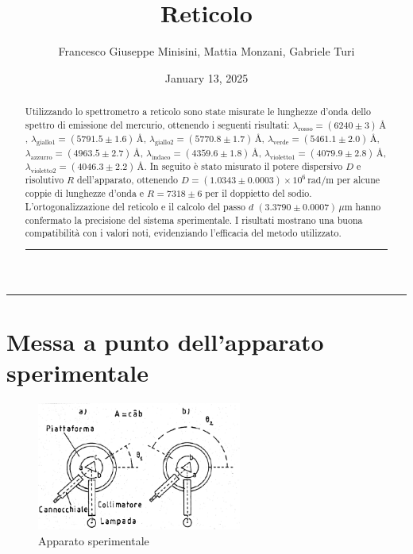 \documentclass[a4paper,12pt]{article}
\title{Reticolo}
\author{Francesco Giuseppe Minisini, Mattia Monzani, Gabriele Turi}
\date{January 13, 2025}
\begin{document}
\maketitle
\hrule
\vspace{9pt}
\begin{abstract}
    \noindent
    Utilizzando lo spettrometro a reticolo sono state misurate le lunghezze d’onda dello spettro di emissione del mercurio, ottenendo i seguenti risultati: \( \lambda_{\text{rosso}} = (6240 \pm 3) \, \text{\AA} \), \( \lambda_{\text{giallo1}} = (5791.5 \pm 1.6) \, \text{\AA} \), \( \lambda_{\text{giallo2}} = (5770.8 \pm 1.7) \, \text{\AA} \), \( \lambda_{\text{verde}} = (5461.1 \pm 2.0) \, \text{\AA} \), \( \lambda_{\text{azzurro}} = (4963.5 \pm 2.7) \, \text{\AA} \), \( \lambda_{\text{indaco}} = (4359.6 \pm 1.8) \, \text{\AA} \), \( \lambda_{\text{violetto1}} = (4079.9 \pm 2.8) \, \text{\AA} \), \( \lambda_{\text{violetto2}} = (4046.3 \pm 2.2) \, \text{\AA} \). 
    In seguito è stato misurato il potere dispersivo \( D \) e risolutivo \( R \) dell’apparato, ottenendo \( D = (1.0343 \pm 0.0003) \times 10^6 \, \text{rad/m} \) per alcune coppie di lunghezze d'onda e \( R = 7318 \pm 6 \) per il doppietto del sodio. L'ortogonalizzazione del reticolo e il calcolo del passo \( d \) \((3.3790 \pm 0.0007) \, \mu\text{m}\) hanno confermato la precisione del sistema sperimentale. I risultati mostrano una buona compatibilità con i valori noti, evidenziando l'efficacia del metodo utilizzato.
\vspace{20pt}
\hrule
\end{abstract}
\vspace{2 pt}


\section{Messa a punto dell'apparato sperimentale}

\begin{figure}[H]
    \centering
    \includegraphics[width=0.6\textwidth]{image.png}
    \caption{Apparato sperimentale}
    \label{fig:camera_millikan}
\end{figure}
\end{document}
